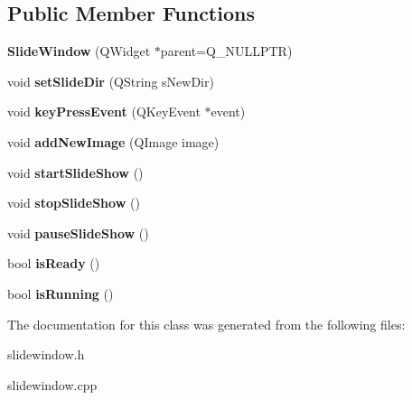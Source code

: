 \subsection*{Public Member Functions}
\begin{DoxyCompactItemize}
\item 
\mbox{\label{classSlideWindow_a069924b6d71578c14bbdedad2fa2497f}} 
{\bfseries Slide\+Window} (Q\+Widget $\ast$parent=Q\+\_\+\+N\+U\+L\+L\+P\+TR)
\item 
\mbox{\label{classSlideWindow_aff6b7e8c3b00f1a17bea3f2dd60a8ad1}} 
void {\bfseries set\+Slide\+Dir} (Q\+String s\+New\+Dir)
\item 
\mbox{\label{classSlideWindow_a0527c72528a39dfbe2a0efc611242464}} 
void {\bfseries key\+Press\+Event} (Q\+Key\+Event $\ast$event)
\item 
\mbox{\label{classSlideWindow_ac85464e7641438ddc5e9051245571135}} 
void {\bfseries add\+New\+Image} (Q\+Image image)
\item 
\mbox{\label{classSlideWindow_a9d3d44873c65713a074ba695b47980bc}} 
void {\bfseries start\+Slide\+Show} ()
\item 
\mbox{\label{classSlideWindow_a89de9d9f9a95ce0a35f74fe4753271c4}} 
void {\bfseries stop\+Slide\+Show} ()
\item 
\mbox{\label{classSlideWindow_afba2bd4fa49e7f3314ed1c8f82eaf381}} 
void {\bfseries pause\+Slide\+Show} ()
\item 
\mbox{\label{classSlideWindow_aeb8eb94e4d5e470ddd23129a337defed}} 
bool {\bfseries is\+Ready} ()
\item 
\mbox{\label{classSlideWindow_aabcc67b2a5443bc5bfe27cbc348fc094}} 
bool {\bfseries is\+Running} ()
\end{DoxyCompactItemize}


The documentation for this class was generated from the following files\+:\begin{DoxyCompactItemize}
\item 
slidewindow.\+h\item 
slidewindow.\+cpp\end{DoxyCompactItemize}
